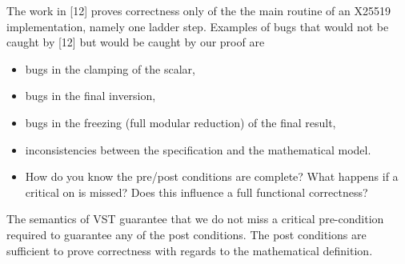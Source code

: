 \begin{answer}
    The work in [12] proves correctness only of the the main routine of an X25519
    implementation, namely one ladder step. Examples of bugs that would not be
    caught by [12] but would be caught by our proof are
    \begin{itemize}
        \item bugs in the clamping of the scalar,
        \item bugs in the final inversion,
        \item bugs in the freezing (full modular reduction) of the final result,
        \item inconsistencies between the specification and the mathematical model.
    \end{itemize}
\end{answer}

\begin{center}
\end{center}

\begin{itemize}
    \item How do you know the pre/post conditions are complete? What happens if a critical on is missed? Does this influence a full functional correctness?
\end{itemize}

\begin{answer}
    The semantics of VST guarantee that we do not miss a critical pre-condition
    required to guarantee any of the post conditions. The post conditions are
    sufficient to prove correctness with regards to the mathematical definition.
\end{answer}
